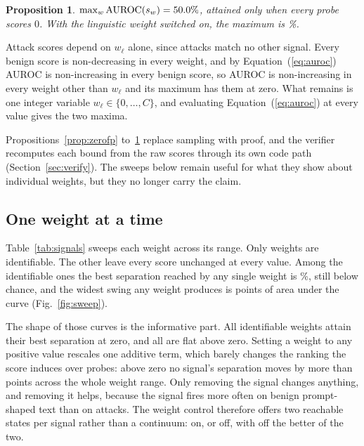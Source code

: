 \documentclass[conference]{IEEEtran}
\newtheorem{proposition}{Proposition}
\begin{document}
\begin{proposition}\label{prop:auroc}
$\max_w \mathrm{AUROC}(s_w) = 50.0{}\%$, attained only when
every probe scores $0$. With the linguistic weight switched on, the maximum is
\BoundAurocMaxLingOn{}\%.
\end{proposition}
\begin{IEEEproof}
Attack scores depend on $w_\ell$ alone, since attacks match no other signal.
Every benign score is non-decreasing in every weight, and by
Equation~(\ref{eq:auroc}) AUROC is non-increasing in every benign score, so
AUROC is non-increasing in every weight other than $w_\ell$ and its maximum
has them at zero. What remains is one integer variable $w_\ell \in \{0,
\dots, C\}$, and evaluating Equation~(\ref{eq:auroc}) at every value gives the
two maxima.
\end{IEEEproof}

Propositions~\ref{prop:zerofp} to~\ref{prop:auroc} replace sampling with
proof, and the verifier recomputes each bound from the raw scores through its
own code path (Section~\ref{sec:verify}). The sweeps below remain useful for
what they show about individual weights, but they no longer carry the claim.

\subsection{One weight at a time}

Table~\ref{tab:signals} sweeps each weight across its range. Only
\NIdentifiableSignals{} weights are identifiable. The other
\NUnidentifiableSignals{} leave every score unchanged at every value. Among
the identifiable ones the best separation reached by any single weight is
\SweepBestAurocAny{}\%, still below chance, and the widest swing any weight
produces is \SweepMaxSpan{} points of area under the curve
(Fig.~\ref{fig:sweep}).

The shape of those curves is the informative part. All
\NBestAtZero{} identifiable weights attain their best separation at zero, and
all \NFlatAboveZero{} are flat above zero. Setting a weight to any positive
value rescales one additive term, which barely changes the ranking the score
induces over probes: above zero no signal's separation moves by more than
\SweepSpanAboveZero{} points across the whole weight range. Only removing the signal changes anything, and removing it helps,
because the signal fires more often on benign prompt-shaped text than on
attacks. The weight control therefore offers two reachable states per signal
rather than a continuum: on, or off, with off the better of the two.
\end{document}
